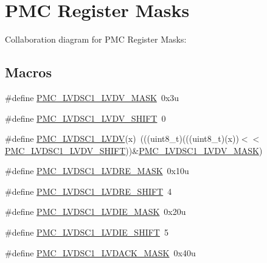 \hypertarget{group___p_m_c___register___masks}{}\section{P\+MC Register Masks}
\label{group___p_m_c___register___masks}
Collaboration diagram for P\+MC Register Masks\+:
\subsection*{Macros}
\begin{DoxyCompactItemize}
\item 
\#define \hyperlink{group___p_m_c___register___masks_ga777eada2a526d88569a30323e9d3e1d3}{P\+M\+C\+\_\+\+L\+V\+D\+S\+C1\+\_\+\+L\+V\+D\+V\+\_\+\+M\+A\+SK}~0x3u
\item 
\#define \hyperlink{group___p_m_c___register___masks_gaaf45daa6de387f93bc57f1218ab17a16}{P\+M\+C\+\_\+\+L\+V\+D\+S\+C1\+\_\+\+L\+V\+D\+V\+\_\+\+S\+H\+I\+FT}~0
\item 
\#define \hyperlink{group___p_m_c___register___masks_gae2cf4048ec29cc1a54349d8bc18e27e4}{P\+M\+C\+\_\+\+L\+V\+D\+S\+C1\+\_\+\+L\+V\+DV}(x)~(((uint8\+\_\+t)(((uint8\+\_\+t)(x))$<$$<$\hyperlink{group___p_m_c___register___masks_gaaf45daa6de387f93bc57f1218ab17a16}{P\+M\+C\+\_\+\+L\+V\+D\+S\+C1\+\_\+\+L\+V\+D\+V\+\_\+\+S\+H\+I\+FT}))\&\hyperlink{group___p_m_c___register___masks_ga777eada2a526d88569a30323e9d3e1d3}{P\+M\+C\+\_\+\+L\+V\+D\+S\+C1\+\_\+\+L\+V\+D\+V\+\_\+\+M\+A\+SK})
\item 
\#define \hyperlink{group___p_m_c___register___masks_gad771f87e373907e3ef60e5fa31001fad}{P\+M\+C\+\_\+\+L\+V\+D\+S\+C1\+\_\+\+L\+V\+D\+R\+E\+\_\+\+M\+A\+SK}~0x10u
\item 
\#define \hyperlink{group___p_m_c___register___masks_ga056ca878a20782f5bf65b3be3e98581d}{P\+M\+C\+\_\+\+L\+V\+D\+S\+C1\+\_\+\+L\+V\+D\+R\+E\+\_\+\+S\+H\+I\+FT}~4
\item 
\#define \hyperlink{group___p_m_c___register___masks_ga1e7518c88ea0037d099124a643788363}{P\+M\+C\+\_\+\+L\+V\+D\+S\+C1\+\_\+\+L\+V\+D\+I\+E\+\_\+\+M\+A\+SK}~0x20u
\item 
\#define \hyperlink{group___p_m_c___register___masks_ga30ca240c9254a7e76123a3cf2bfdc40e}{P\+M\+C\+\_\+\+L\+V\+D\+S\+C1\+\_\+\+L\+V\+D\+I\+E\+\_\+\+S\+H\+I\+FT}~5
\item 
\#define \hyperlink{group___p_m_c___register___masks_ga65d04677ca16ad916563d6673cb8ecaa}{P\+M\+C\+\_\+\+L\+V\+D\+S\+C1\+\_\+\+L\+V\+D\+A\+C\+K\+\_\+\+M\+A\+SK}~0x40u
$$
\end{DoxyCompactItemize}
